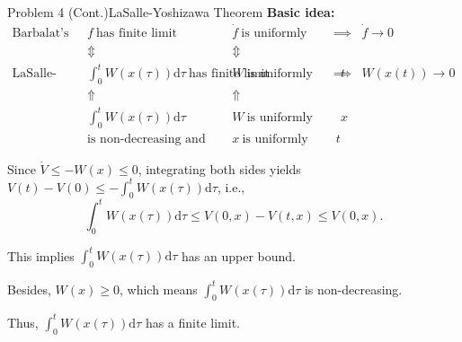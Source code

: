 \documentclass[8pt]{beamer}
\begin{document}
\begin{frame}[t]{Problem 4 (Cont.)}{LaSalle-Yoshizawa Theorem}
  \textbf{Basic idea:}
    {\footnotesize\[\begin{matrix}
      \text{Barbalat's lemma}&f\ \text{has finite limit} & \dot{f}\ \text{is uniformly continuous} & \implies & \dot{f}\to 0\\
      &\Updownarrow & \Updownarrow & &\\
      \text{LaSalle-Yoshizawa Theorem}&\int^t_0  W (x (\tau)) \mathrm{d} \tau\ \text{has finite limit} & W\ \text{is uniformly continuous w.r.t.}\ t & \implies & W(x(t))\to 0\\
      &\Uparrow &\Uparrow && \\
      & \int^t_0  W (x (\tau)) \mathrm{d} \tau\ & W\ \text{is uniformly continuous w.r.t.}\ x&&\\
      &\text{is non-decreasing and upper bounded}&x\ \text{is uniformly continuous w.r.t.}\ t &&
    \end{matrix}\]}
 
    Since $\dot{V} \le -W(x) \le 0$, integrating both sides yields $V(t)-V(0) \le -\int^t_0W(x(\tau))\mathrm{d}\tau$, i.e.,
  \begin{equation*}
      \int^t_0W(x(\tau))\mathrm{d}\tau \le V(0,x)-V(t,x) \le V(0,x).
  \end{equation*}
  
  This implies $\int^t_0W(x(\tau))\mathrm{d}\tau$ has an upper bound. 
  
  Besides, $W(x) \ge 0$, which means $\int^t_0W(x(\tau))\mathrm{d}\tau$ is non-decreasing. 
  
  Thus, $\int^t_0W(x(\tau))\mathrm{d}\tau$ has a finite limit.
  
  \end{frame}
\end{document}
